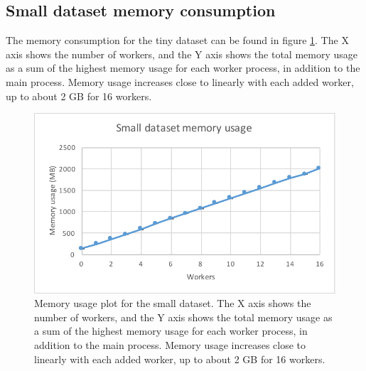 \subsection{Small dataset memory consumption}
The memory consumption for the tiny dataset can be found in figure \ref{fig:dataset_2_memory}.
The X axis shows the number of workers, and the Y axis shows the total memory usage as
a sum of the highest memory usage for each worker process, in addition to the main process. Memory usage increases close to linearly with each added worker,
up to about 2 GB for 16 workers.
\begin{figure}[ht]
  \centering
  \includegraphics[width=120mm]{figures/dataset_2/dataset_2_memory.pdf}
  \caption[Memory usage plot for the small dataset.]{Memory usage plot for the small dataset. The X axis shows the number of workers, and the Y axis shows the total memory usage as
  a sum of the highest memory usage for each worker process, in addition to the main process. Memory usage increases close to linearly with each added worker,
  up to about 2 GB for 16 workers.}
  \label{fig:dataset_2_memory}
\end{figure}

